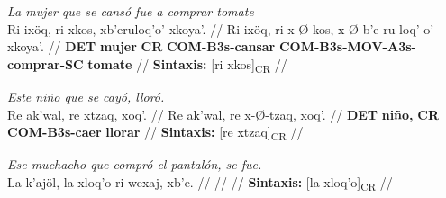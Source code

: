 \documentclass{article}%
\begin{document}
%
\par\medskip%
\ex
\textit{La mujer que se cansó fue a comprar tomate} \\
\begingl
\gla Ri ixöq, ri xkos, xb'eruloq'o' xkoya'. //
\glb Ri ixöq, ri x-Ø-kos, x-Ø-b'e-ru-loq'-o' xkoya'. //
\glc \textbf{DET} \textbf{mujer} \textbf{CR} \textbf{COM-}\textbf{B3s-}\textbf{cansar} \textbf{COM-}\textbf{B3s-}\textbf{MOV-}\textbf{A3s-}\textbf{comprar-}\textbf{SC} \textbf{tomate} //
\glft \textbf{Sintaxis:} [ri xkos]\textsubscript{CR} //
\endgl
\xe
%
\medskip%
\par\medskip%
\ex
\textit{Este niño que se cayó, lloró.} \\
\begingl
\gla Re ak'wal, re xtzaq, xoq'. //
\glb Re ak'wal, re x-Ø-tzaq, xoq'. //
\glc \textbf{DET} \textbf{niño,} \textbf{CR} \textbf{COM-}\textbf{B3s-}\textbf{caer} \textbf{llorar} //
\glft \textbf{Sintaxis:} [re xtzaq]\textsubscript{CR} //
\endgl
\xe
%
\medskip%
\par\medskip%
\ex
\textit{Ese muchacho que compró el pantalón, se fue.} \\
\begingl
\gla La k'ajöl, la xloq'o ri wexaj, xb'e. //
\glb  //
\glc  //
\glft \textbf{Sintaxis:} [la xloq'o]\textsubscript{CR} //
\endgl
\xe
%
\medskip

%
\end{document}
